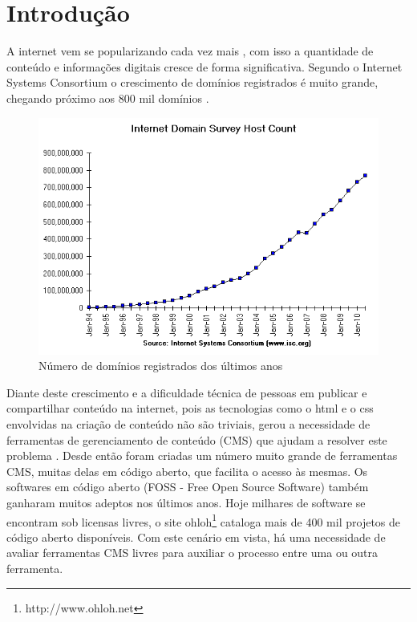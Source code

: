\chapter{Introdução}

A internet vem se popularizando cada vez mais \cite{internet_stats}, com isso a quantidade de conteúdo e informações digitais cresce de forma significativa. Segundo o Internet Systems Consortium o crescimento de domínios registrados é muito grande, chegando próximo aos 800 mil domínios \cite{isc}. 

\begin{figure}[here]
\includegraphics[width=150mm]{images/isc_hosts.png}
\caption{Número de domínios registrados dos últimos anos}
\label{fig:isc_hosts.png}
\end{figure}

Diante deste crescimento e a dificuldade técnica de pessoas em publicar e compartilhar conteúdo na internet, pois as  tecnologias como o html e o css envolvidas na criação de conteúdo não são triviais, gerou a necessidade de ferramentas de gerenciamento de conteúdo (CMS) que ajudam a resolver este problema \cite{content_for_one}. Desde então foram criadas um número muito grande de ferramentas CMS, muitas delas em código aberto, que facilita o acesso às mesmas. Os softwares em código aberto (FOSS - Free Open Source Software) também ganharam muitos adeptos nos últimos anos. Hoje milhares de software se encontram sob licensas livres, o site ohloh\footnote{http://www.ohloh.net} cataloga mais de 400 mil projetos de código aberto disponíveis. Com este cenário em vista, há uma necessidade de avaliar ferramentas CMS livres para auxiliar o processo entre uma ou outra ferramenta.

